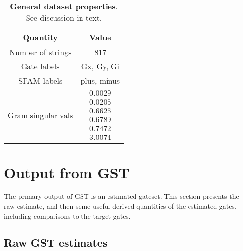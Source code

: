 \documentclass{article}[11pt]
\begin{document}
\begin{table}[h]
\begin{center}
\begin{tabular}[l]{|c|c|}
\hline
Quantity & Value \\ \hline
Number of strings & 817 \\ \hline
Gate labels & Gx, Gy, Gi \\ \hline
SPAM labels & plus, minus \\ \hline
Gram singular vals & \small$ \begin{array}{c}
0.0029 \\ 
0.0205 \\ 
0.6626 \\ 
0.6789 \\ 
0.7472 \\ 
3.0074
 \end{array} $
 \\ \hline
\end{tabular}

\caption{\textbf{General dataset properties}.  See discussion in text.\label{datasetOverviewTable}}
\end{center}
\end{table}

\section{Output from GST\label{secOutput}}

The primary output of GST is an estimated gateset.  This section presents the raw estimate, and then some useful derived quantities of the estimated gates, including comparisons to the target gates.

\subsection{Raw GST estimates}
\end{document}
